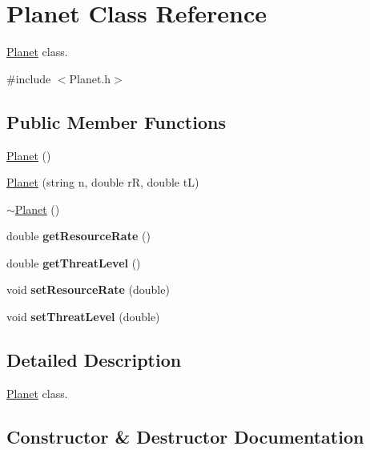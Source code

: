 \hypertarget{classPlanet}{}\section{Planet Class Reference}
\label{classPlanet}


\hyperlink{classPlanet}{Planet} class.  




{\ttfamily \#include $<$Planet.\+h$>$}

\subsection*{Public Member Functions}
\begin{DoxyCompactItemize}
\item 
\hyperlink{classPlanet_ac88200b337a62e1377858e3116f9412b}{Planet} ()
\item 
\hyperlink{classPlanet_afd66d974488511c495e6e5aa2e886085}{Planet} (string n, double rR, double tL)
\item 
\hyperlink{classPlanet_aaa1aaed9d4ef90b4836531edb7b18e0a}{$\sim$\+Planet} ()
\item 
\mbox{\label{classPlanet_ab8b1c3018f15bb37af41371526c6bbe2}} 
double {\bfseries get\+Resource\+Rate} ()
\item 
\mbox{\label{classPlanet_a4bda8bf9239f4d3c7a0a60a1ed52edea}} 
double {\bfseries get\+Threat\+Level} ()
\item 
\mbox{\label{classPlanet_a305bd81b25e55ad28cb966b5ac4e4dce}} 
void {\bfseries set\+Resource\+Rate} (double)
\item 
\mbox{\label{classPlanet_a765f62442f84f54666f9975633478930}} 
void {\bfseries set\+Threat\+Level} (double)
\end{DoxyCompactItemize}


\subsection{Detailed Description}
\hyperlink{classPlanet}{Planet} class. 

\subsection{Constructor \& Destructor Documentation}
\mbox{\label{classPlanet_ac88200b337a62e1377858e3116f9412b}} 
